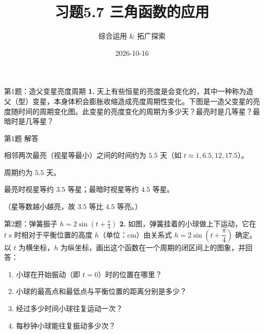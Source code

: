 \documentclass[10pt,aspectratio=169,serif]{beamer}
\title[习题5.7]{习题5.7 三角函数的应用}
\subtitle{综合运用 \& 拓广探索}
\author{}
\institute{}
\date{2026-10-16}
\begin{document}
\begin{frame}
  \titlepage
\end{frame}

\begin{frame}[t]{第1题：造父变星亮度周期}
\textbf{1.} 天上有些恒星的亮度是会变化的，其中一种称为造父（型）变星，本身体积会膨胀收缩造成亮度周期性变化。下图是一造父变星的亮度随时间的周期变化图。此变星的亮度变化的周期为多少天？最亮时是几等星？最暗时是几等星？

\begin{center}
\end{center}
\end{frame}

\begin{frame}[t]{第1题 解答}
\begin{tcolorbox}[colback=orange!10,colframe=orange,title=\textbf{解}]
相邻两次最亮（视星等最小）之间的时间约为 $5.5$ 天（如 $t\approx 1,6.5,12,17.5$）。

\alert{周期约为 $5.5$ 天}。

最亮时视星等约 $3.5$ 等星；最暗时视星等约 $4.5$ 等星。

\small（星等数越小越亮，故 $3.5$ 等比 $4.5$ 等亮。）
\end{tcolorbox}
\end{frame}

\begin{frame}[t]{第2题：弹簧振子 $h=2\sin(t+\frac{\pi}{4})$}
\textbf{2.} 如图，弹簧挂着的小球做上下运动，它在 $t$ s 时相对于平衡位置的高度 $h$（单位：cm）由关系式 $h=2\sin\!\left(t+\dfrac{\pi}{4}\right)$ 确定。以 $t$ 为横坐标，$h$ 为纵坐标，画出这个函数在一个周期的闭区间上的图象，并回答：
\begin{enumerate}
  \item 小球在开始振动（即 $t=0$）时的位置在哪里？
  \item 小球的最高点和最低点与平衡位置的距离分别是多少？
  \item 经过多少时间小球往复运动一次？
  \item 每秒钟小球能往复振动多少次？
\end{enumerate}
\end{frame}
\end{document}
